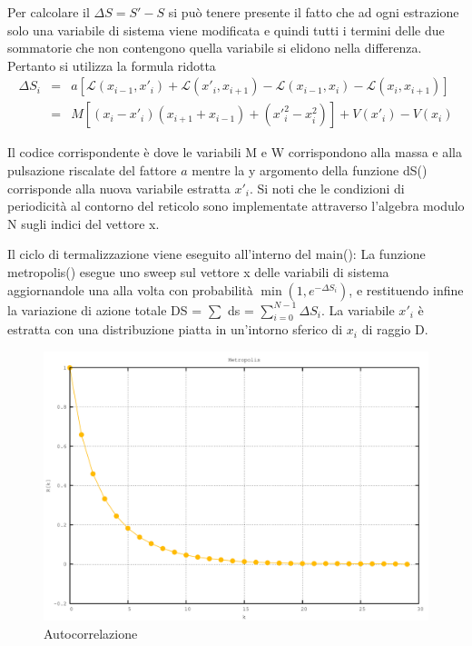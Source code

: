 Per calcolare il $\Delta S = S'-S$ si può tenere presente il fatto che ad ogni estrazione solo una variabile di sistema viene modificata e quindi tutti i termini delle due sommatorie che non contengono quella variabile si elidono nella differenza. Pertanto si utilizza la formula ridotta
\begin{eqnarray*}
 \Delta S_i &=& a[\mathcal{L}(x_{i-1},x'_{i})+\mathcal{L}(x'_{i},x_{i+1})-\mathcal{L}(x_{i-1},x_{i})-\mathcal{L}(x_{i},x_{i+1})]\\
   &=& M[(x_{i}-x'_{i})(x_{i+1}+x_{i-1})+(x'^2_i-x^2_i)]+V(x'_i)-V(x_i)
\end{eqnarray*}

Il codice corrispondente è
dove le variabili {\ttfamily M} e {\ttfamily W} corrispondono alla massa e alla pulsazione riscalate del fattore $a$ mentre la {\ttfamily y} argomento della funzione {\ttfamily dS()} corrisponde alla nuova variabile estratta $x'_{i}$. Si noti che le condizioni di periodicità al contorno del reticolo sono implementate attraverso l'algebra modulo N sugli indici del vettore {\ttfamily x}.

Il ciclo di termalizzazione viene eseguito all'interno del {\ttfamily main()}:
La funzione {\ttfamily metropolis()} esegue uno sweep sul vettore {\ttfamily x} delle variabili di sistema aggiornandole una alla volta con probabilità $\min(1,e^{-\Delta S_i})$, e restituendo infine la variazione di azione totale {\ttfamily DS} = {\ttfamily $\sum$ ds} = $\sum^{N-1}_{i=0}\Delta S_i$.
La variabile $x'_i$ è estratta con una distribuzione piatta in un'intorno sferico di $x_i$ di raggio {\ttfamily D}.

\begin{figure}[H]
\centering
\includegraphics[width=\textwidth]{autocorrelation}
\caption{Autocorrelazione}
\label{fig:autocorrelation}
\end{figure}

